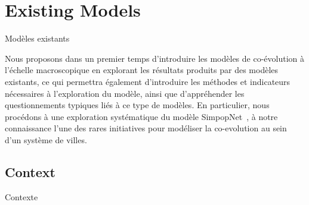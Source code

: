 




\newpage


\section{Existing Models}{Modèles existants}

\label{sec:macrocoevolexplo}



Nous proposons dans un premier temps d'introduire les modèles de co-évolution à l'échelle macroscopique en explorant les résultats produits par des modèles existants, ce qui permettra également d'introduire les méthodes et indicateurs nécessaires à l'exploration du modèle, ainsi que d'appréhender les questionnements typiques liés à ce type de modèles. En particulier, nous procédons à une exploration systématique du modèle SimpopNet~\cite{schmitt2014modelisation}, à notre connaissance l'une des rares initiatives pour modéliser la co-evolution au sein d'un système de villes.



\subsection{Context}{Contexte}


